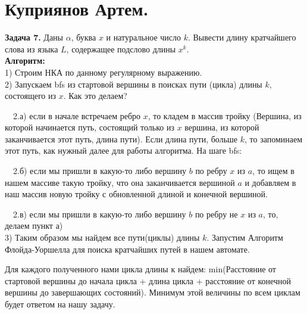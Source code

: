 \documentclass[a4paper,12pt]{paper} %
\begin{document}
\section{Куприянов Артем.} 
\textbf{Задача 7. } Даны $\alpha$, буква $x$ и натуральное число $k$. Вывести длину кратчайшего слова из языка $L$, содержащее подслово длины $x^{k}$.
\\ 

\textbf{Алгоритм:} \\

1) Строим НКА по данному регулярному выражению. \\

2) Запускаем bfs из стартовой вершины в поисках пути (цикла) длины $k$, состоящего из  $x$. Как это делаем? 


\ \ 2.а) если в начале встречаем ребро $x$, то кладем в массив тройку (Вершина, из которой начинается путь, состоящий только из  $x$ вершина, из которой заканчивается этот путь, длина пути). Если длина пути, больше $k$, то запоминаем этот путь, как нужный далее для работы алгоритма. На шаге bfs: 

\ \ 2.б) если мы пришли в какую-то либо вершину $b$ по ребру $x$ из  $a$, то ищем в нашем массиве такую тройку, что она заканчивается вершиной $a$ и добавляем в наш массив новую тройку с обновленной длиной и конечной вершиной.

\ \ 2.в) если мы пришли в какую-то либо вершину $b$ по ребру не $x$ из  $a$, то, делаем пункт а) \\

3) Таким образом мы найдем все пути(циклы) длины   $k$. Запустим Алгоритм Флойда-Уоршелла для поиска кратчайших путей в нашем автомате. 

Для каждого полученного нами цикла длины $к$ найдем: min(Расстояние от стартовой вершины до начала цикла + длина цикла + расстояние от конечной вершины до завершающих состояний). Минимум этой величины по всем циклам будет ответом на нашу задачу.
\end{document}
